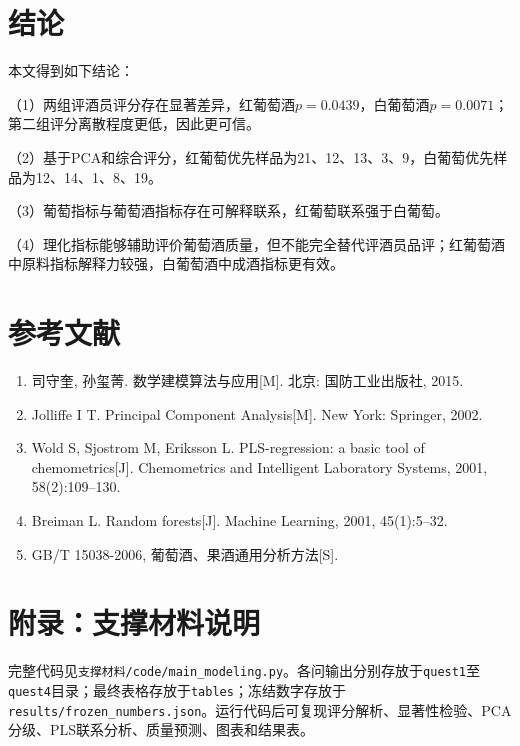 \documentclass[UTF8,a4paper,12pt]{ctexart}
\begin{document}
\section{结论}
本文得到如下结论：

（1）两组评酒员评分存在显著差异，红葡萄酒$p=0.0439$，白葡萄酒$p=0.0071$；第二组评分离散程度更低，因此更可信。

（2）基于PCA和综合评分，红葡萄优先样品为21、12、13、3、9，白葡萄优先样品为12、14、1、8、19。

（3）葡萄指标与葡萄酒指标存在可解释联系，红葡萄联系强于白葡萄。

（4）理化指标能够辅助评价葡萄酒质量，但不能完全替代评酒员品评；红葡萄酒中原料指标解释力较强，白葡萄酒中成酒指标更有效。
\section{参考文献}
\begin{enumerate}
\item 司守奎, 孙玺菁. 数学建模算法与应用[M]. 北京: 国防工业出版社, 2015.
\item Jolliffe I T. Principal Component Analysis[M]. New York: Springer, 2002.
\item Wold S, Sjostrom M, Eriksson L. PLS-regression: a basic tool of chemometrics[J]. Chemometrics and Intelligent Laboratory Systems, 2001, 58(2):109--130.
\item Breiman L. Random forests[J]. Machine Learning, 2001, 45(1):5--32.
\item GB/T 15038-2006, 葡萄酒、果酒通用分析方法[S].
\end{enumerate}
\appendix
\section{附录：支撑材料说明}
完整代码见\texttt{支撑材料/code/main\_modeling.py}。各问输出分别存放于\texttt{quest1}至\texttt{quest4}目录；最终表格存放于\texttt{tables}；冻结数字存放于\texttt{results/frozen\_numbers.json}。运行代码后可复现评分解析、显著性检验、PCA分级、PLS联系分析、质量预测、图表和结果表。
\end{document}
